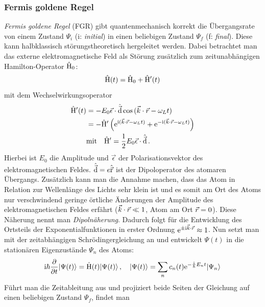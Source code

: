 \subsubsection{Fermis goldene Regel}\label{subsubsec:fermis_goldene_regel}
\textit{Fermis goldene Regel} (FGR) gibt quantenmechanisch korrekt die
Übergangsrate von einem Zustand $\Psi_i$ (i: \textit{initial}) in einen
beliebigen Zustand $\Psi_f$ (f: \textit{final}). Diese kann halbklassisch
störungstheoretisch hergeleitet werden.  Dabei betrachtet man das externe elektromagnetische Feld als Störung
zusätzlich zum zeitunabhängigen Hamilton-Operator $\hat{\mathrm{H}}_0$:
\begin{equation}\label{eq:hamilton}
	\hat{\mathrm{H}}(t)=\hat{\mathrm{H}}_0+\hat{\mathrm{H}}'(t)
\end{equation}
mit dem Wechselwirkungsoperator
\begin{equation}\label{eq:ww}
	\begin{split}
		\hat{\mathrm{H}}'(t) &= -E_0\vec{\epsilon}\cdot\hat{\vec{\mathrm{d}}}\cos{(\vec{k}\cdot\vec{r}-\omega_L t)}\\
		&=
		-\hat{\mathrm{H}}'\left(\mathrm{e}^{\mathrm{i}(\vec{k}\cdot\vec{r}-\omega_L
		t)}+\mathrm{e}^{-\mathrm{i}(\vec{k}\cdot\vec{r}-\omega_L t)}\right)\\
		&\text{mit}\quad
		\hat{\mathrm{H}}'=\frac{1}{2}E_0\vec{\epsilon}\cdot\hat{\vec{\mathrm{d}}}\,.
	\end{split}
\end{equation}
Hierbei ist $E_0$ die Amplitude und $\vec{\epsilon}$ der
Polarisationsvektor des elektromagnetischen Feldes. $\hat{\vec{\mathrm{d}}} = e\hat{\vec{\mathrm{r}}}$ ist
der Dipoloperator des atomaren Übergangs. Zusätzlich kann man die Annahme
machen, dass das Atom in Relation zur Wellenlänge des Lichts sehr klein ist und es somit am Ort
des Atoms nur verschwindend geringe örtliche Änderungen der Amplitude des
elektromagnetischen Feldes erfährt ($\vec{k}\cdot\vec{r}\ll 1$, Atom am Ort $\vec{r}=0$). Diese Näherung nennt man
\textit{Dipolnäherung}. Dadurch folgt für die Entwicklung des
Ortsteils der Exponentialfunktionen in erster Ordnung
$\mathrm{e}^{\pm\mathrm{i}\vec{k}\cdot\vec{r}}\approx1$. Nun setzt man mit der zeitabhängigen Schrödingergleichung an und entwickelt $\Psi(t)$ in die stationären Eigenzustände $\Psi_n$ des Atoms:
\begin{equation}\label{eq:sgl_stoerung_01}
	\mathrm{i}\hbar\frac{\partial }{\partial t}|{\Psi(t)}\rangle=\hat{\mathrm{H}}(t)|{\Psi(t)}\rangle\,,
	\quad
	|{\Psi(t)}\rangle=\sum\limits_n{c_n(t)\mathrm{e}^{-\frac{\mathrm{i}}{\hbar} E_n
	t}|{\Psi_n}\rangle}
\end{equation}
Führt man die Zeitableitung aus und projiziert beide Seiten der Gleichung auf
einen beliebigen Zustand $\Psi_f$, findet man
